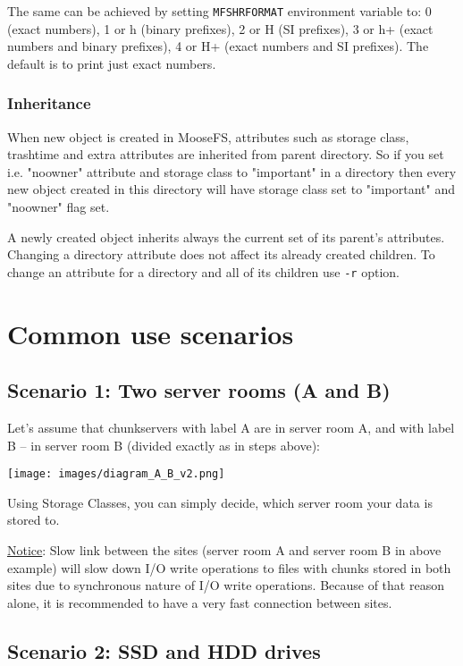 \documentclass[a4paper,11pt,english]{report}
\def\code#1{\texttt{#1}}
\begin{document}
					The same can be achieved by setting \code{MFSHRFORMAT} environment variable to: 0 (exact numbers), 1 or h (binary prefixes), 2 or H (SI prefixes), 3 or h+ (exact numbers and binary prefixes), 4 or H+ (exact numbers and SI prefixes). The default is to print just exact numbers.
				
				\subsubsection{Inheritance}
					When new object is created in MooseFS, attributes such as storage class, trashtime and extra attributes are inherited from parent directory. So if you set i.e. "noowner" attribute and storage class to "important" in a directory then every new object created in this directory will have  storage class set to "important" and "noowner" flag set.
					
					A newly created object inherits always the current set of its parent's attributes. Changing a directory attribute does not affect its already created children. To change an attribute for a directory and all of its children use \code{-r} option.		
				
		\pagebreak
				
		\section{Common use scenarios}
			\subsection{Scenario 1: Two server rooms (A and B)}
			
			Let's assume that chunkservers with label A are in server room A, and with label B -- in server room B (divided exactly as in steps above):
			
			\texttt{[image: images/diagram\_A\_B\_v2.png]}
			
			Using Storage Classes, you can simply decide, which server room your data is stored to.
	
			\underline{Notice}: Slow link between the sites (server room A and server room B in above example) will slow down I/O write operations to files with chunks stored in both sites due to synchronous nature of I/O write operations. Because of that reason alone, it is recommended to have a very fast connection between sites.
			
			\pagebreak			
			
			\subsection{Scenario 2: SSD and HDD drives}
	
\end{document}
